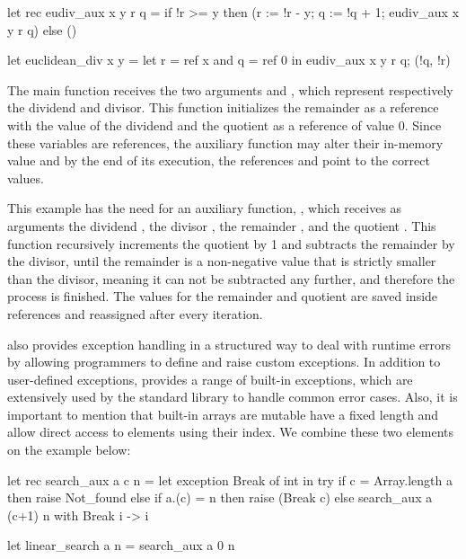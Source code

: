 \begin{ocamlenv}
let rec eudiv_aux x y r q =
  if !r >= y then (r := !r - y; q := !q + 1; eudiv_aux x y r q)
  else ()

let euclidean_div x y =
    let r = ref x and q = ref 0 in 
  eudiv_aux x y r q;
  (!q, !r)
\end{ocamlenv}

The main function  receives the two arguments  and , which represent respectively
the dividend and divisor. This function initializes the remainder  as a reference with the value of the dividend 
 and the quotient  as a reference of value 0. Since these variables are references, the auxiliary function
may alter their in-memory value and by the end of its execution, the references  and  point to the correct 
values.

This example has the need for an auxiliary function, , which receives as arguments the dividend 
, the divisor , the remainder , and the quotient . This function recursively
increments the quotient by 1 and subtracts the remainder by the divisor, until the remainder 
is a non-negative value that is strictly smaller than the divisor, meaning it can not be subtracted any further, and therefore the 
process is finished. The values for the remainder and quotient are saved inside references and reassigned after every iteration.

\ocaml also provides exception handling in a structured way to deal with runtime errors by allowing programmers to define 
and raise custom exceptions. In addition to user-defined exceptions, \ocaml provides a range of built-in exceptions, which are 
extensively used by the standard library to handle common error cases. Also, it is important to mention that built-in arrays are mutable
have a fixed length and allow direct access to elements using their index. We combine these two elements on the example below:

\begin{ocamlenv}
let rec search_aux a c n =
  let exception Break of int in try
    if c = Array.length a then raise Not_found 
    else if a.(c) = n then raise (Break c) 
    else search_aux a (c+1) n
  with Break i -> i

let linear_search a n = search_aux a 0 n
\end{ocamlenv}

